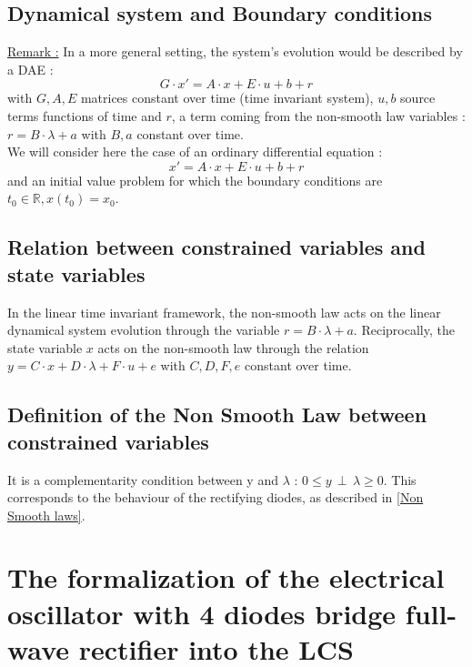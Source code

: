 \documentclass[10pt]{article}
\begin{document}
\subsection{Dynamical system and Boundary conditions}
\underline{Remark :}
In a more general setting, the system's evolution would be described by a DAE :
\[
G \cdot x' = A \cdot x + E \cdot u + b + r 
\]
with $G , A , E$ matrices constant over time (time invariant system), $u , b$ source terms functions of time and $r$,
a term coming from the non-smooth law variables : $r = B \cdot \lambda + a$ with $B , a$ constant over time.\\
We will consider here the case of an ordinary differential equation :
\[
x' = A \cdot x + E \cdot u + b + r 
\]
and an initial value problem for which the boundary conditions are $t_0 \in \mathbb{R} , x(t_0)= x_0$.

\subsection{Relation between constrained variables and state variables}
In the linear time invariant framework, the non-smooth law acts on the linear dynamical system evolution through the variable 
$r = B \cdot \lambda + a$. Reciprocally, the state variable $x$ acts on the non-smooth law through the relation
$y = C \cdot x + D \cdot \lambda + F \cdot u + e$ with $C , D , F , e$ constant over time.

\subsection{Definition of the Non Smooth Law between constrained variables}
It is a complementarity condition between y and $\lambda$ : $0 \leq y \, \perp \, \lambda \geq 0$. This corresponds
to the behaviour of the rectifying diodes, as described in \ref{Non Smooth laws}.
 
\section{The formalization of the electrical oscillator with 4 diodes bridge full-wave rectifier into the LCS}
\end{document}

